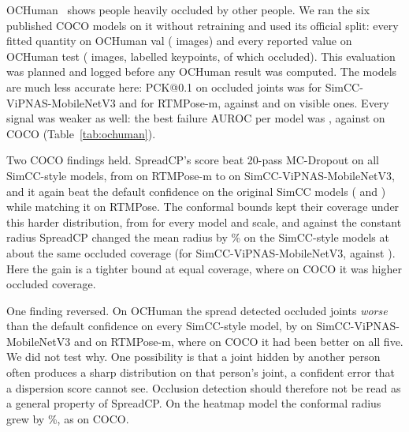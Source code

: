 \documentclass[preprint,11pt]{elsarticle}
\newcommand{\method}{SpreadCP}
\begin{document}
OCHuman~\cite{zhang2019pose2seg} shows people heavily occluded by other people. We ran the six published
COCO models on it without retraining and used its official split: every fitted quantity on OCHuman val
(\ochNumCalImages{} images) and every reported value on OCHuman test (\ochNumTestImages{} images,
\ochNumKptTest{} labelled keypoints, of which \ochNumOccTest{} occluded). This evaluation was planned
and logged before any OCHuman result was computed. The models are much less accurate here: PCK@0.1 on
occluded joints was \PckOccOchSimccMbvThree{} for SimCC-ViPNAS-MobileNetV3 and \PckOccOchRtmposeM{} for
RTMPose-m, against \PckVisOchSimccMbvThree{} and \PckVisOchRtmposeM{} on visible ones. Every signal was
weaker as well: the best failure AUROC per model was \ochBestFaRange{}, against \cocoBestFaRange{} on COCO
(Table~\ref{tab:ochuman}).

Two COCO findings held. \method{}'s score beat 20-pass MC-Dropout on all \ochNumSimcc{} SimCC-style
models, from \DfaOchRtmposeM{} on RTMPose-m to \DfaOchSimccMbvThree{} on SimCC-ViPNAS-MobileNetV3, and it
again beat the default confidence on the original SimCC models (\DfaconfOchSimccMbvThree{} and
\DfaconfOchSimccRFiveZero{}) while matching it on RTMPose. The conformal bounds kept their coverage under
this harder distribution, from \ochCoverageRange{} for every model and scale, and against the
constant radius \method{} changed the mean radius by \ochRadiusRange\% on the SimCC-style models at about
the same occluded coverage (for SimCC-ViPNAS-MobileNetV3, \CovOccOchSimccMbvThreeDist{} against
\CovOccOchSimccMbvThreeConstant{}). Here the gain is a tighter bound at equal coverage, where on COCO it
was higher occluded coverage.

One finding reversed. On OCHuman the spread detected occluded joints \emph{worse} than the default
confidence on every SimCC-style model, by \DoaconfOchSimccMbvThree{} on SimCC-ViPNAS-MobileNetV3 and
\DoaconfOchRtmposeM{} on RTMPose-m, where on COCO it had been better on all five. We did not test why. One
possibility is that a joint hidden by another person often produces a sharp distribution on that
person's joint, a confident error that a dispersion score cannot see. Occlusion detection should
therefore not be read as a general property of \method{}. On the heatmap model the conformal radius grew
by \RadiusChangeOchHmRFiveZero\%, as on COCO.

\begin{table}[t]
\centering\small
\caption{OCHuman test, COCO-trained models without retraining, all fitting on OCHuman val. PCK is
PCK@0.1 on occluded joints. ``Spread minus'' columns are paired failure AUROC differences, and the
occlusion column the paired occlusion AUROC difference. Occluded coverage is for 90\% conformal regions.
$^\ast$Heatmap model, for which the spread is not \method{}'s SimCC score.}
\label{tab:ochuman}
\end{table}
\end{document}

